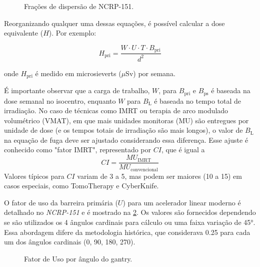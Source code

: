 \documentclass[11pt,a4paper]{article}
\newcounter{exemplo}
\begin{document}
	\begin{figure}[!h]
		\centering
		\caption{Frações de dispersão de NCRP-151.}
		\label{fig:prFracaoEspalhamento}
	\end{figure}

	Reorganizando qualquer uma dessas equações, é possível calcular a dose equivalente ($H$). Por exemplo:

		\begin{equation}
		H_{\text{pri}} = \frac{{W \cdot U \cdot T \cdot B_{\text{pri}}}}{{d^2}}
		\end{equation}

	onde $H_{\text{pri}}$ é medido em microsieverts ($\mu$Sv) por semana.

	É importante observar que a carga de trabalho, $W$, para $B_{\text{pri}}$ e $B_{\text{ps}}$ é baseada na dose semanal no isocentro, enquanto $W$ para $B_{\text{L}}$ é baseada no tempo total de irradiação. No caso de técnicas como IMRT ou terapia de arco modulado volumétrico (VMAT), em que mais unidades monitoras (MU) são entregues por unidade de dose (e os tempos totais de irradiação são mais longos), o valor de $B_{\text{L}}$ na equação de fuga deve ser ajustado considerando essa diferença. Esse ajuste é conhecido como "fator IMRT", representado por $CI$, que é igual a $$CI = \frac{{MU_{\text{IMRT}}}}{{MU_{\text{convencional}}}}$$ Valores típicos para $CI$ variam de 3 a 5, mas podem ser maiores (10 a 15) em casos especiais, como TomoTherapy e CyberKnife.

	O fator de uso da barreira primária ($U$) para um acelerador linear moderno é detalhado no \textit{NCRP-151} e é mostrado na \ref{fig:prFatorUso}. Os valores são fornecidos dependendo se são utilizados os 4 ângulos cardinais para cálculo ou uma faixa variação de \ang{45}. Essa abordagem difere da metodologia histórica, que considerava 0.25 para cada um dos ângulos cardinais (0, 90, 180, 270). 

	\begin{figure}[!h]
		\centering
		\caption{Fator de Uso por ângulo do gantry.}
		\label{fig:prFatorUso}
	\end{figure}
	
\end{document}
